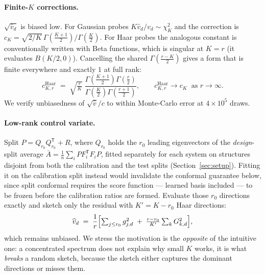\documentclass{article}
\begin{document}
\paragraph{Finite-$K$ corrections.}
$\sqrt{\widehat v_d}$ is biased low. For Gaussian probes $K\widehat v_d/v_d\sim\chi^2_K$ and the
correction is $c_K=\sqrt{2/K}\,\Gamma(\tfrac{K+1}{2})/\Gamma(\tfrac K2)$. For Haar probes the
analogous constant is conventionally written with Beta functions, which is singular at $K=r$
(it evaluates $B(K/2,0)$). Cancelling the shared $\Gamma(\tfrac{r-K}{2})$ gives a form that is
finite everywhere and exactly $1$ at full rank:
\begin{equation}
c^{\mathrm{Haar}}_{K,r}\;=\;\sqrt{\tfrac{r}{K}}\;
\frac{\Gamma\!\left(\tfrac{K+1}{2}\right)\Gamma\!\left(\tfrac r2\right)}
     {\Gamma\!\left(\tfrac K2\right)\Gamma\!\left(\tfrac{r+1}{2}\right)} ,
\qquad c^{\mathrm{Haar}}_{K,r}\to c_K \ \text{ as } r\to\infty .
\end{equation}
We verify unbiasedness of $\sqrt{\widehat v}/c$ to within Monte-Carlo error at $4\times10^5$ draws.

\paragraph{Low-rank control variate.}
Split $P = Q_{r_0}Q_{r_0}^{\mathsf T} + R$, where $Q_{r_0}$ holds the $r_0$ leading eigenvectors of
the \emph{design}-split average $\bar A=\tfrac1n\sum_i PF_i^{\mathsf T}F_iP$, fitted separately for
each system on structures disjoint from both the calibration and the test splits
(Section~\ref{sec:setup}). Fitting it on the calibration split instead would invalidate the conformal
guarantee below, since split conformal requires the score function --- learned basis included --- to
be frozen before the calibration ratios are formed. Evaluate those $r_0$
directions exactly and sketch only the residual with $K'=K-r_0$ Haar directions:
\begin{equation}
\widehat v_d \;=\; \frac{1}{r}\Bigl[\textstyle\sum_{j\le r_0} g_{j,d}^2 \;+\; \frac{r-r_0}{K'}\sum_{k} G_{k,d}^2\Bigr],
\end{equation}
which remains unbiased. We stress the motivation is the \emph{opposite} of the intuitive one: a
concentrated spectrum does not explain why small $K$ works, it is what \emph{breaks} a random sketch,
because the sketch either captures the dominant directions or misses them.
\end{document}
